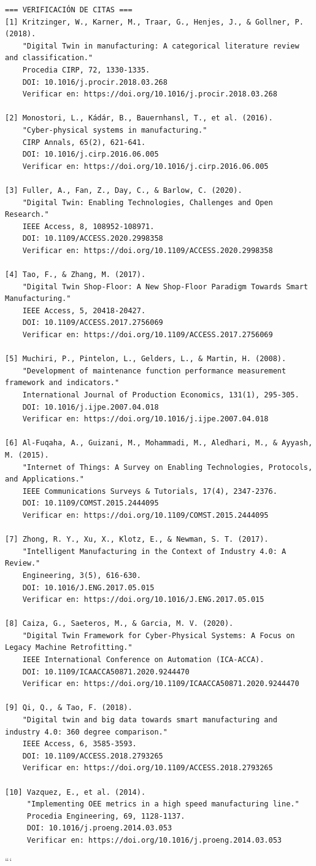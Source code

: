 \begin{verbatim}
=== VERIFICACIÓN DE CITAS ===
[1] Kritzinger, W., Karner, M., Traar, G., Henjes, J., & Gollner, P. (2018). 
    "Digital Twin in manufacturing: A categorical literature review and classification." 
    Procedia CIRP, 72, 1330-1335. 
    DOI: 10.1016/j.procir.2018.03.268
    Verificar en: https://doi.org/10.1016/j.procir.2018.03.268

[2] Monostori, L., Kádár, B., Bauernhansl, T., et al. (2016).
    "Cyber-physical systems in manufacturing."
    CIRP Annals, 65(2), 621-641.
    DOI: 10.1016/j.cirp.2016.06.005
    Verificar en: https://doi.org/10.1016/j.cirp.2016.06.005

[3] Fuller, A., Fan, Z., Day, C., & Barlow, C. (2020).
    "Digital Twin: Enabling Technologies, Challenges and Open Research."
    IEEE Access, 8, 108952-108971.
    DOI: 10.1109/ACCESS.2020.2998358
    Verificar en: https://doi.org/10.1109/ACCESS.2020.2998358

[4] Tao, F., & Zhang, M. (2017).
    "Digital Twin Shop-Floor: A New Shop-Floor Paradigm Towards Smart Manufacturing."
    IEEE Access, 5, 20418-20427.
    DOI: 10.1109/ACCESS.2017.2756069
    Verificar en: https://doi.org/10.1109/ACCESS.2017.2756069

[5] Muchiri, P., Pintelon, L., Gelders, L., & Martin, H. (2008).
    "Development of maintenance function performance measurement framework and indicators."
    International Journal of Production Economics, 131(1), 295-305.
    DOI: 10.1016/j.ijpe.2007.04.018
    Verificar en: https://doi.org/10.1016/j.ijpe.2007.04.018

[6] Al-Fuqaha, A., Guizani, M., Mohammadi, M., Aledhari, M., & Ayyash, M. (2015).
    "Internet of Things: A Survey on Enabling Technologies, Protocols, and Applications."
    IEEE Communications Surveys & Tutorials, 17(4), 2347-2376.
    DOI: 10.1109/COMST.2015.2444095
    Verificar en: https://doi.org/10.1109/COMST.2015.2444095

[7] Zhong, R. Y., Xu, X., Klotz, E., & Newman, S. T. (2017).
    "Intelligent Manufacturing in the Context of Industry 4.0: A Review."
    Engineering, 3(5), 616-630.
    DOI: 10.1016/J.ENG.2017.05.015
    Verificar en: https://doi.org/10.1016/J.ENG.2017.05.015

[8] Caiza, G., Saeteros, M., & Garcia, M. V. (2020).
    "Digital Twin Framework for Cyber-Physical Systems: A Focus on Legacy Machine Retrofitting."
    IEEE International Conference on Automation (ICA-ACCA).
    DOI: 10.1109/ICAACCA50871.2020.9244470
    Verificar en: https://doi.org/10.1109/ICAACCA50871.2020.9244470

[9] Qi, Q., & Tao, F. (2018).
    "Digital twin and big data towards smart manufacturing and industry 4.0: 360 degree comparison."
    IEEE Access, 6, 3585-3593.
    DOI: 10.1109/ACCESS.2018.2793265
    Verificar en: https://doi.org/10.1109/ACCESS.2018.2793265

[10] Vazquez, E., et al. (2014).
     "Implementing OEE metrics in a high speed manufacturing line."
     Procedia Engineering, 69, 1128-1137.
     DOI: 10.1016/j.proeng.2014.03.053
     Verificar en: https://doi.org/10.1016/j.proeng.2014.03.053
\end{verbatim}
```